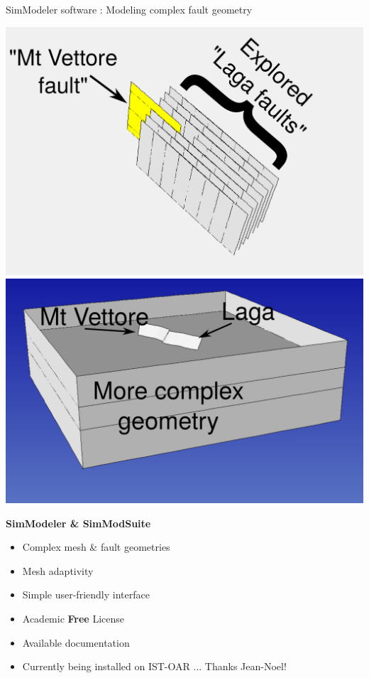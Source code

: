 \documentclass{beamer}
\begin{document}
\begin{frame}
 {SimModeler software : Modeling complex fault geometry}
 
 \begin{minipage}{0.4\linewidth}
 \includegraphics[width=1\linewidth]{images/simmodeler12.pdf} \\  
 \includegraphics[width=1\linewidth]{images/simmodeler13.pdf}  
 \end{minipage}
 \begin{minipage}{0.58\linewidth}
 {\bf SimModeler \& SimModSuite}
 \vskip 0.5cm
  \begin{itemize}
   \item Complex mesh \& fault geometries \pause
   \item Mesh adaptivity \pause
   \item Simple user-friendly interface \pause
   \item Academic {\bf Free} License \pause
   \item Available documentation \pause
   \item Currently being installed on IST-OAR ... Thanks Jean-Noel!
  \end{itemize}
 \end{minipage}

 
\end{frame}
\end{document}
